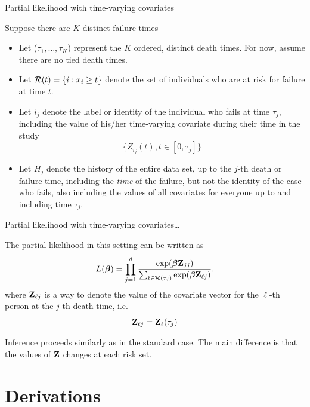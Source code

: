\documentclass[ignorenonframetext,]{beamer}
\newcommand{\bbeta}{\mbox{\boldmath$\beta$}}
\begin{document}
\begin{frame}{%
\protect\hypertarget{partial-likelihood-with-time-varying-covariates}{%
Partial likelihood with time-varying covariates}}

Suppose there are \(K\) distinct failure times

\begin{itemize}
\item
  Let (\(\tau_1, \ldots, \tau_K\)) represent the \(K\) ordered, distinct
  death times. For now, assume there are no tied death times.
\item
  Let \({\cal R}(t) = \{ i: x_i \ge t \}\) denote the set of individuals
  who are at risk for failure at time \(t\).
\item
  Let \(i_j\) denote the label or identity of the individual who fails
  at time \(\tau_j\), including the value of his/her time-varying
  covariate during their time in the study
  \[   \{Z_{i_j}(t), t\in [0,\tau_j]\} \]
\item
  Let \(H_j\) denote the history of the entire data set, up to the
  \(j\)-th death or failure time, including the \emph{time} of the
  failure, but not the identity of the case who fails, also including
  the values of all covariates for everyone up to and including time
  \(\tau_j\).
\end{itemize}

\end{frame}

\begin{frame}{%
\protect\hypertarget{partial-likelihood-with-time-varying-covariates-1}{%
Partial likelihood with time-varying covariates\ldots}}

The partial likelihood in this setting can be written as \[
L(\bbeta) = \prod_{j=1}^{d} \frac {\exp(\bbeta {\bf Z}_{jj}) }
{\sum_{\ell \in {\cal R}(\tau_j)} \exp(\bbeta {\bf Z}_{\ell j}) },
\] where \({\bf Z}_{\ell j}\) is a way to denote the value of the
covariate vector for the \(\ell\)-th person at the \(j\)-th death time,
i.e. \[ {\bf Z}_{\ell j} =  {\bf Z}_\ell(\tau_j) \]

Inference proceeds similarly as in the standard case. The main
difference is that the values of \({\bf Z}\) changes at each risk set.

\end{frame}

\hypertarget{derivations}{%
\section{Derivations}\label{derivations}}
\end{document}
